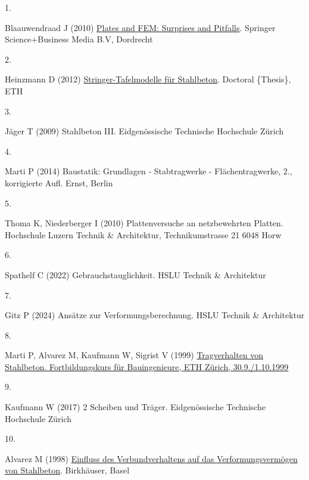 \documentclass[
  11pt,
  letterpaper,
]{scrreprt}
\newlength{\cslhangindent}
\newlength{\csllabelwidth}
\newenvironment{CSLReferences}[2] %
 {\begin{list}{}{%
  \setlength{\itemindent}{0pt}
  \setlength{\leftmargin}{0pt}
  \setlength{\parsep}{0pt}
  \ifodd #1
   \setlength{\leftmargin}{\cslhangindent}
   \setlength{\itemindent}{-1\cslhangindent}
  \fi
  \setlength{\itemsep}{#2\baselineskip}}}
 {\end{list}}
\newcommand{\CSLLeftMargin}[1]{\parbox[t]{\csllabelwidth}{\strut#1\strut}}
\newcommand{\CSLRightInline}[1]{\parbox[t]{\linewidth - \csllabelwidth}{\strut#1\strut}}
\begin{document}
\label{refs}
\begin{CSLReferences}{0}{1}
\CSLLeftMargin{1. }%
\CSLRightInline{Blaauwendraad J (2010)
\href{https://doi.org/10.1007/978-90-481-3596-7}{Plates and {FEM}:
{Surprises} and {Pitfalls}}. Springer Science+Business Media B.V,
Dordrecht}

\CSLLeftMargin{2. }%
\CSLRightInline{Heinzmann D (2012)
\href{https://doi.org/10.3929/ethz-a-007344037}{Stringer-{Tafelmodelle}
für {Stahlbeton}}. Doctoral \{Thesis\}, ETH}

\CSLLeftMargin{3. }%
\CSLRightInline{Jäger T (2009) Stahlbeton {III}. Eidgenössische
Technische Hochschule Zürich}

\CSLLeftMargin{4. }%
\CSLRightInline{Marti P (2014) Baustatik: {Grundlagen} - {Stabtragwerke}
- {Flächentragwerke}, 2., korrigierte Aufl. Ernst, Berlin}

\CSLLeftMargin{5. }%
\CSLRightInline{Thoma K, Niederberger I (2010) Plattenversuche an
netzbewehrten {Platten}. Hochschule Luzern Technik \& Architektur,
Technikumstrasse 21 6048 Horw}

\CSLLeftMargin{6. }%
\CSLRightInline{Spathelf C (2022) Gebrauchstauglichkeit. HSLU Technik \&
Architektur}

\CSLLeftMargin{7. }%
\CSLRightInline{Gitz P (2024) Ansätze zur {Verformungsberechnung}. HSLU
Technik \& Architektur}

\CSLLeftMargin{8. }%
\CSLRightInline{Marti P, Alvarez M, Kaufmann W, Sigrist V (1999)
\href{https://doi.org/10.3929/ethz-a-004470343}{Tragverhalten von
{Stahlbeton}. {Fortbildungskurs} für {Bauingenieure}, {ETH} {Zürich},
30.9./1.10.1999}}

\CSLLeftMargin{9. }%
\CSLRightInline{Kaufmann W (2017) 2 {Scheiben} und {Träger}.
Eidgenössische Technische Hochschule Zürich}

\CSLLeftMargin{10. }%
\CSLRightInline{Alvarez M (1998)
\href{https://doi.org/10.3929/ethz-a-002000033}{Einfluss des
{Verbundverhaltens} auf das {Verformungsvermögen} von {Stahlbeton}}.
Birkhäuser, Basel}

\end{CSLReferences}
\end{document}
